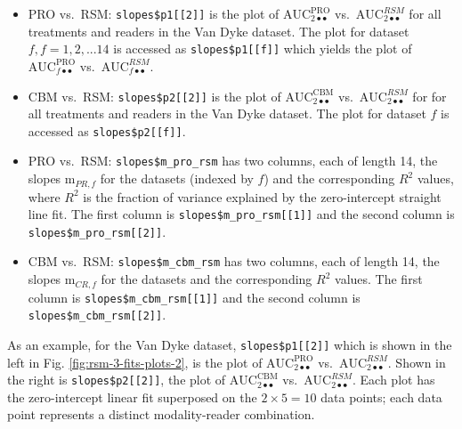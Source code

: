 \documentclass[
]{book}
\providecommand{\tightlist}{%
  \setlength{\itemsep}{0pt}\setlength{\parskip}{0pt}}
\begin{document}
\begin{itemize}
\tightlist
\item
  PRO vs.~RSM: \texttt{slopes\$p1{[}{[}2{]}{]}} is the plot of \(\text{AUC}^{\text{PRO}}_{2 \bullet \bullet}\) vs.~\(\text{AUC}^{RSM}_{2 \bullet \bullet}\) for all treatments and readers in the Van Dyke dataset. The plot for dataset \(f, f = 1, 2, ...14\) is accessed as \texttt{slopes\$p1{[}{[}f{]}{]}} which yields the plot of \(\text{AUC}^{\text{PRO}}_{f \bullet \bullet}\) vs.~\(\text{AUC}^{RSM}_{f \bullet \bullet}\).
\item
  CBM vs.~RSM: \texttt{slopes\$p2{[}{[}2{]}{]}} is the plot of \(\text{AUC}^{\text{CBM}}_{2 \bullet \bullet}\) vs.~\(\text{AUC}^{RSM}_{2 \bullet \bullet}\) for for all treatments and readers in the Van Dyke dataset. The plot for dataset \(f\) is accessed as \texttt{slopes\$p2{[}{[}f{]}{]}}.
\item
  PRO vs.~RSM: \texttt{slopes\$m\_pro\_rsm} has two columns, each of length 14, the slopes \(\text{m}_{PR,f}\) for the datasets (indexed by \(f\)) and the corresponding \(R^2\) values, where \(R^2\) is the fraction of variance explained by the zero-intercept straight line fit. The first column is \texttt{slopes\$m\_pro\_rsm{[}{[}1{]}{]}} and the second column is \texttt{slopes\$m\_pro\_rsm{[}{[}2{]}{]}}.
\item
  CBM vs.~RSM: \texttt{slopes\$m\_cbm\_rsm} has two columns, each of length 14, the slopes \(\text{m}_{CR,f}\) for the datasets and the corresponding \(R^2\) values. The first column is \texttt{slopes\$m\_cbm\_rsm{[}{[}1{]}{]}} and the second column is \texttt{slopes\$m\_cbm\_rsm{[}{[}2{]}{]}}.
\end{itemize}

As an example, for the Van Dyke dataset, \texttt{slopes\$p1{[}{[}2{]}{]}} which is shown in the left in Fig. \ref{fig:rsm-3-fits-plots-2}, is the plot of \(\text{AUC}^{\text{PRO}}_{2 \bullet \bullet}\) vs.~\(\text{AUC}^{RSM}_{2 \bullet \bullet}\). Shown in the right is \texttt{slopes\$p2{[}{[}2{]}{]}}, the plot of \(\text{AUC}^{\text{CBM}}_{2 \bullet \bullet}\) vs.~\(\text{AUC}^{RSM}_{2 \bullet \bullet}\). Each plot has the zero-intercept linear fit superposed on the \(2\times5 = 10\) data points; each data point represents a distinct modality-reader combination.
\end{document}
